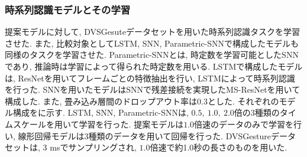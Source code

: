 \subsubsection{時系列認識モデルとその学習}
提案モデルに対して, DVSGesuteデータセットを用いた時系列認識タスクを学習させた.
また, 比較対象としてLSTM, SNN, Parametric-SNN\cite{ParametricSNN}で構成したモデルも同様のタスクを学習させた.
Parametric-SNNとは, 時定数を学習可能としたSNNであり, 推論時は学習によって得られた時定数を用いる.
LSTMで構成したモデルは, ResNet\cite{ResNet}を用いてフレームごとの特徴抽出を行い, LSTMによって時系列認識を行った\cite{CNNLSTM}.
SNNを用いたモデルはSNNで残差接続を実現したMS-ResNet\cite{MSResNet}を用いて構成した.
また, 畳み込み層間のドロップアウト率は0.3とした.
それぞれのモデル構成をに示す.
LSTM, SNN, Parametric-SNNは, $0.5,~1.0,~2.0$倍の3種類のタイムスケールを用いて学習を行った.
提案モデルは$1.0$倍速のデータのみで学習を行い, 線形回帰モデルは3種類のデータを用いて回帰を行った.
DVSGestureデータセットは, 3 msでサンプリングされ, $1.0$倍速で約1.0秒の長さのものを用いた.
